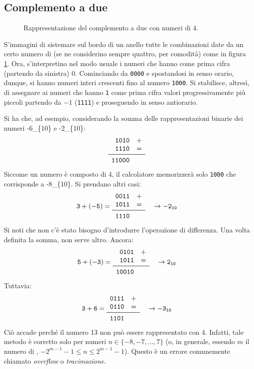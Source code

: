 	\subsection{Complemento a due}

\begin{figure}
	\centering

	\caption[Complemento a due]{Rappresentazione del complemento a due con numeri di \SI{4}{\bit}.}
	\label{fig:2comp}
\end{figure}

S'immagini di sistemare sul bordo di un anello tutte le combinazioni date da un certo numero di \si{\bit} (se ne considerino sempre quattro, per comodità) come in figura \ref{fig:2comp}.
Ora, s'interpretino nel modo usuale i numeri che hanno come prima cifra (partendo da sinistra) \num{0}.
Cominciando da \lstinline!0000! e spostandosi in senso orario, dunque, si hanno numeri interi crescenti fino al numero \lstinline!1000!.
Si stabilisce, altresì, di assegnare ai numeri che hanno \lstinline!1! come prima cifra valori progressivamente più piccoli partendo da $-1$ (\lstinline!1111!) e proseguendo in senso antiorario.

Si ha che, ad esempio, considerando la somma delle rappresentazioni binarie dei numeri \num[parse-numbers=false]{-6_{10}} e \num[parse-numbers=false]{-2_{10}}:
\[
	\begin{array}{r l}
\mathtt{1010}	&+	\\
\mathtt{1110}	&=	\\
		\midrule
\mathtt{11000}
	\end{array}
\]
Siccome un numero è composto di \SI{4}{\bit}, il calcolatore memorizzerà solo \lstinline!1000! che corrisponde a \num[parse-numbers=false]{-8_{10}}.
Si prendano altri casi:
\[
\mathtt{
3+(-5)=
	\begin{array}{r l}
\mathtt{0011}	&+	\\
\mathtt{1011}	&=	\\
		\midrule
\mathtt{1110}
	\end{array}
\quad \rightarrow-2_{10}
}
\]
Si noti che non c'è stato bisogno d'introdurre l'operazione di differenza.
Una volta definita la somma, non serve altro.
Ancora:
\[
\mathtt{
5+(-3)=
	\begin{array}{r l}
\mathtt{0101}	&+	\\
\mathtt{1011}	&=	\\
		\midrule
\mathtt{10010}
	\end{array}
\quad \rightarrow2_{10}
}
\]
Tuttavia:
\[
\mathtt{
3+6=
	\begin{array}{r l}
\mathtt{0111}	&+	\\
\mathtt{0110}	&=	\\
		\midrule
\mathtt{1101}
	\end{array}
\quad \rightarrow-3_{10}
}
\]
Ciò accade perché il numero \num{13} non può essere rappresentato con \SI{4}{\bit}.
Infatti, tale metodo è corretto solo per numeri $n\in\{-8,-7,\dots,7\}$ (o, in generale, essendo $m$ il numero di \si{\bit}, $-2^{m-1}-1\le n \le 2^{m-1}-1$).
Questo è un errore comunemente chiamato \emph{overflow} o \emph{tracimazione}.

